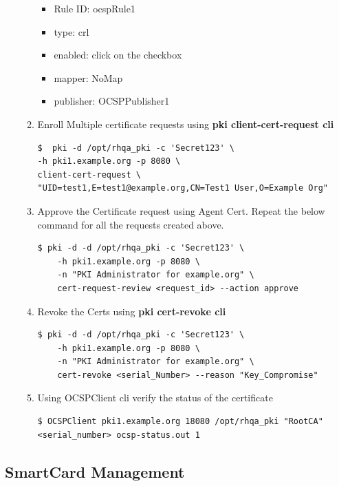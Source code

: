 \documentclass[a4paper]{article}
\begin{document}
\begin{enumerate}[label*=\arabic*.]
\begin{enumerate}[label*=\arabic*.]
                    \begin{itemize}
                        \item Rule ID: ocspRule1
                        \item type: crl
                        \item enabled: click on the checkbox
                        \item mapper: NoMap
                        \item publisher: OCSPPublisher1
                    \end{itemize}
                \item Enroll Multiple certificate requests using \textbf{pki client-cert-request cli}
                    \begin{lstlisting}
$  pki -d /opt/rhqa_pki -c 'Secret123' \
-h pki1.example.org -p 8080 \
client-cert-request \
"UID=test1,E=test1@example.org,CN=Test1 User,O=Example Org"
                    \end{lstlisting}
                \item Approve the Certificate request using Agent Cert. Repeat the below command for all the requests created above.
                    \begin{lstlisting}[style=bashInputStyle]
$ pki -d -d /opt/rhqa_pki -c 'Secret123' \
    -h pki1.example.org -p 8080 \
    -n "PKI Administrator for example.org" \
    cert-request-review <request_id> --action approve       
                    \end{lstlisting}
                \item Revoke the Certs using \textbf{pki cert-revoke cli}
                    \begin{lstlisting}[style=bashInputStyle]
$ pki -d -d /opt/rhqa_pki -c 'Secret123' \
    -h pki1.example.org -p 8080 \
    -n "PKI Administrator for example.org" \
    cert-revoke <serial_Number> --reason "Key_Compromise"
                    \end{lstlisting}
                \item Using OCSPClient cli verify the status of the certificate
                    \begin{lstlisting}[style=bashInputStyle]
$ OCSPClient pki1.example.org 18080 /opt/rhqa_pki "RootCA" <serial_number> ocsp-status.out 1                    
                    \end{lstlisting}
             \end{enumerate}
    \end{enumerate}
\subsection{SmartCard Management}
\end{document}
